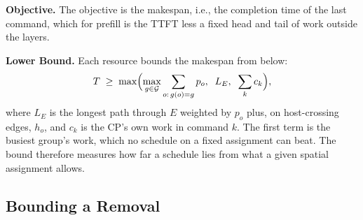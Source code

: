 \textbf{Objective.}
The objective is the makespan, i.e., the completion time of the last command, which for prefill is the TTFT less a fixed head and tail of work outside the layers.

\textbf{Lower Bound.}
\label{subsec:bound}
Each resource bounds the makespan from below:
\begin{equation}
\label{eq:lb}
T \;\ge\; \max\Bigl(\max_{g \in \mathcal{G}} \sum_{o:\,g(o)=g} p_o,\;\; L_E,\;\; \sum_{k} c_k\Bigr),
\end{equation}
where $L_E$ is the longest path through $E$ weighted by $p_o$ plus, on host-crossing edges, $h_o$, and $c_k$ is the CP's own work in command $k$.
The first term is the busiest group's work, which no schedule on a fixed assignment can beat.
The bound therefore measures how far a schedule lies from what a given spatial assignment allows.


\subsection{Bounding a Removal}
\label{subsec:removal}

